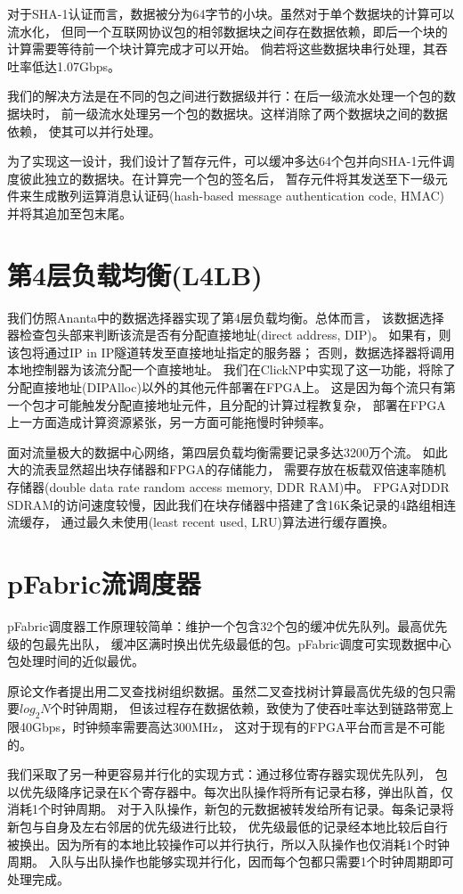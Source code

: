 对于SHA-1认证而言，数据被分为64字节的小块。虽然对于单个数据块的计算可以流水化，
但同一个互联网协议包的相邻数据块之间存在数据依赖，即后一个块的计算需要等待前一个块计算完成才可以开始。
倘若将这些数据块串行处理，其吞吐率低达1.07Gbps。

我们的解决方法是在不同的包之间进行数据级并行：在后一级流水处理一个包的数据块时，
前一级流水处理另一个包的数据块。这样消除了两个数据块之间的数据依赖，
使其可以并行处理。

为了实现这一设计，我们设计了暂存元件，可以缓冲多达64个包并向SHA-1元件调度彼此独立的数据块。在计算完一个包的签名后，
暂存元件将其发送至下一级元件来生成散列运算消息认证码(hash-based message authentication code, HMAC)并将其追加至包末尾。

\section{第4层负载均衡(L4LB)}
我们仿照Ananta中的数据选择器实现了第4层负载均衡。总体而言，
该数据选择器检查包头部来判断该流是否有分配直接地址(direct address, DIP)。
如果有，则该包将通过IP in IP隧道转发至直接地址指定的服务器；
否则，数据选择器将调用本地控制器为该流分配一个直接地址。
我们在ClickNP中实现了这一功能，将除了分配直接地址(DIPAlloc)以外的其他元件部署在FPGA上。
这是因为每个流只有第一个包才可能触发分配直接地址元件，且分配的计算过程教复杂，
部署在FPGA上一方面造成计算资源紧张，另一方面可能拖慢时钟频率。

面对流量极大的数据中心网络，第四层负载均衡需要记录多达3200万个流。
如此大的流表显然超出块存储器和FPGA的存储能力，
需要存放在板载双倍速率随机存储器(double data rate random access memory, DDR RAM)中。
FPGA对DDR SDRAM的访问速度较慢，因此我们在块存储器中搭建了含16K条记录的4路组相连流缓存，
通过最久未使用(least recent used, LRU)算法进行缓存置换。

\section{pFabric流调度器}
pFabric调度器工作原理较简单：维护一个包含32个包的缓冲优先队列。最高优先级的包最先出队，
缓冲区满时换出优先级最低的包。pFabric调度可实现数据中心包处理时间的近似最优。

原论文作者提出用二叉查找树组织数据。虽然二叉查找树计算最高优先级的包只需要$log_2N$个时钟周期，
但该过程存在数据依赖，致使为了使吞吐率达到链路带宽上限40Gbps，时钟频率需要高达300MHz，
这对于现有的FPGA平台而言是不可能的。

我们采取了另一种更容易并行化的实现方式：通过移位寄存器实现优先队列，
包以优先级降序记录在K个寄存器中。每次出队操作将所有记录右移，弹出队首，仅消耗1个时钟周期。
对于入队操作，新包的元数据被转发给所有记录。每条记录将新包与自身及左右邻居的优先级进行比较，
优先级最低的记录经本地比较后自行被换出。因为所有的本地比较操作可以并行执行，所以入队操作也仅消耗1个时钟周期。
入队与出队操作也能够实现并行化，因而每个包都只需要1个时钟周期即可处理完成。
